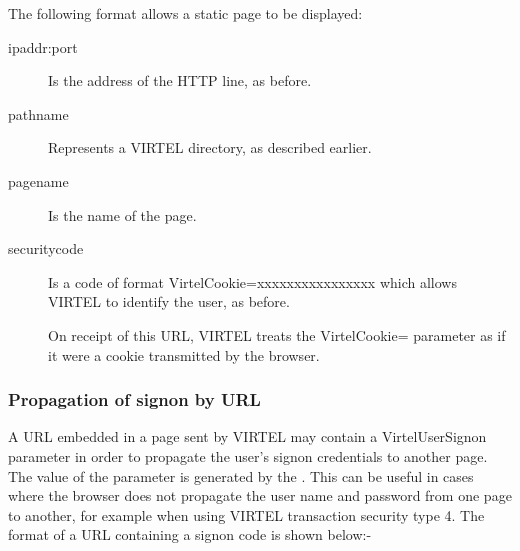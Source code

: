 \documentclass[letterpaper,10pt,english]{sphinxmanual}
\begin{document}
The following format allows a static page to be displayed:

\begin{sphinxVerbatim}[commandchars=\\\{\}]
\end{sphinxVerbatim}
\begin{description}
\item[{ipaddr:port}] \leavevmode
Is the address of the HTTP line, as before.

\item[{pathname}] \leavevmode
Represents a VIRTEL directory, as described earlier.

\item[{pagename}] \leavevmode
Is the name of the page.

\item[{securitycode}] \leavevmode
Is a code of format VirtelCookie=xxxxxxxxxxxxxxxx which allows VIRTEL to identify the user, as before.

On receipt of this URL, VIRTEL treats the VirtelCookie= parameter as if it were a cookie transmitted by the browser.

\end{description}


\subsubsection{Propagation of signon by URL}
\label{\detokenize{User_Guide:propagation-of-signon-by-url}}\label{\detokenize{User_Guide:v457ug-signon-propagation}}
A URL embedded in a page sent by VIRTEL may contain a VirtelUserSignon parameter in order to propagate the user’s signon credentials to another page. The value of the parameter is generated by the {\hyperref[\detokenize{User_Guide:v457ug-user-signon-code}]{}}. This can be useful in cases where the browser does not propagate the user name and password from one page to another, for example when using VIRTEL transaction security type 4. The format of a URL containing a signon code is shown below:-
\end{document}
